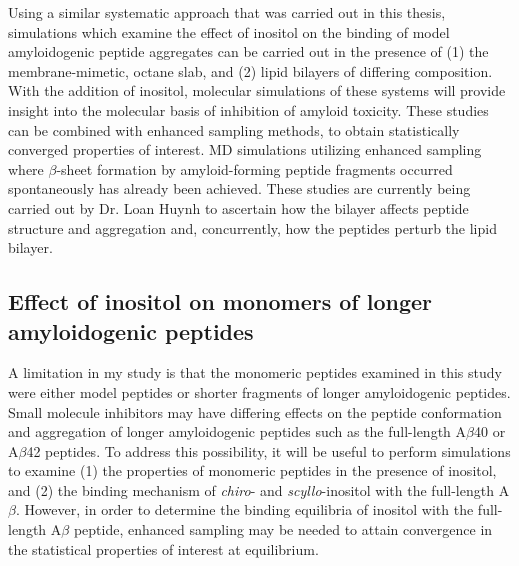 Using a similar systematic approach that was carried out in this thesis, simulations which examine the effect of inositol on the binding of model amyloidogenic peptide aggregates can be carried out in the presence of (1) the membrane-mimetic, octane slab, and (2) lipid bilayers of differing composition. With the addition of inositol, molecular simulations of these systems will provide insight into the  molecular basis of inhibition of amyloid toxicity. These studies can be combined with enhanced sampling methods,\cite{Rauscher:2009wr} to obtain statistically converged properties of interest.  MD simulations utilizing enhanced sampling where $\beta$-sheet formation by amyloid-forming peptide fragments occurred spontaneously has already been achieved.  These studies are currently being carried out by Dr. Loan Huynh to ascertain how the bilayer affects peptide structure and aggregation and, concurrently, how the peptides perturb the lipid bilayer.


\subsection{Effect of inositol on monomers of longer amyloidogenic peptides}
A limitation in my study is that the monomeric peptides examined in this study were either model peptides or shorter fragments of longer amyloidogenic peptides. Small molecule inhibitors may have differing effects on the peptide conformation and aggregation of longer amyloidogenic peptides such as the full-length A$\beta$40 or A$\beta$42 peptides. To address this possibility, it will be useful to perform simulations to examine (1) the properties of monomeric peptides in the presence of inositol, and (2) the binding mechanism of \textit{chiro}- and \textit{scyllo}-inositol with the full-length A$\beta$. However, in order to determine the binding equilibria of inositol with  the full-length A$\beta$ peptide, enhanced sampling may be needed to attain convergence in the statistical properties of interest at equilibrium.

